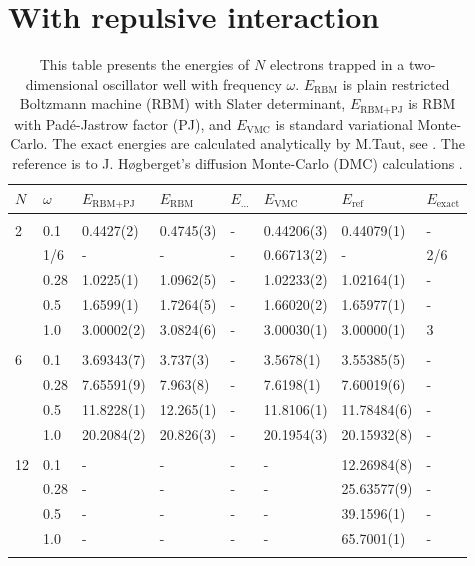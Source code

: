 \section{With repulsive interaction}
\begin{table} [H]
	\caption{This table presents the energies of $N$ electrons trapped in a two-dimensional oscillator well with frequency $\omega$. $E_{\text{RBM}}$ is plain restricted Boltzmann machine (RBM) with Slater determinant, $E_{\text{RBM+PJ}}$ is RBM with Padé-Jastrow factor (PJ), and $E_{\text{VMC}}$ is standard variational Monte-Carlo. The exact energies are calculated analytically by M.Taut, see \cite{taut_two_1994}. The reference is to J. Høgberget's diffusion Monte-Carlo (DMC) calculations \cite{hogberget_quantum_2013}.} 
	\begin{tabularx}{\textwidth}{l:l|XXXXXX} \hline\hline
		\label{tab:quantumdotswinteraction2D}
		$N$ & $\omega$ & $E_{\text{RBM+PJ}}$ & $E_{\text{RBM}}$ & $E_{\text{...}}$ & $E_{\text{VMC}}$ & $E_{\text{ref}} $ & $E_{\text{exact}}$ \\ \hline \\
		2 & 0.1 & 0.4427(2) & 0.4745(3) & - & 0.44206(3) & 0.44079(1) & - \\ 
		& 1/6 & - & - & - & 0.66713(2) & - & 2/6 \\
		& 0.28 & 1.0225(1) & 1.0962(5) & - & 1.02233(2) & 1.02164(1) & - \\
		& 0.5 & 1.6599(1) & 1.7264(5) & - & 1.66020(2) & 1.65977(1)  & - \\
		& 1.0 & 3.00002(2) & 3.0824(6) & - & 3.00030(1) & 3.00000(1) & 3  \\ \hdashline \\
		
		6 & 0.1 & 3.69343(7) & 3.737(3) & - & 3.5678(1) & 3.55385(5) & - \\ 
		& 0.28 & 7.65591(9) & 7.963(8) & - & 7.6198(1) & 7.60019(6) & - \\
		& 0.5 & 11.8228(1) & 12.265(1) & - & 11.8106(1) & 11.78484(6) & - \\
		& 1.0 & 20.2084(2) & 20.826(3) & - & 20.1954(3) & 20.15932(8) & - \\ \hdashline \\
		
		12 & 0.1 & - & - & - & - & 12.26984(8) & -\\ 
		& 0.28 & - & - & - & - & 25.63577(9) & -\\
		& 0.5 & - & - & - & - & 39.1596(1) & - \\
		& 1.0 & - & - & - & - & 65.7001(1) & - \\ \hdashline \\
		

\end{tabularx}
\end{table}

